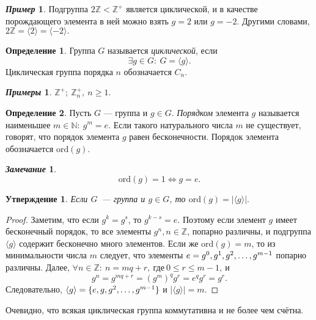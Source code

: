 \documentclass[a4paper, 14pt]{extarticle}
\newcommand{\integers}{\mathbb{Z}}
\newcommand{\naturals}{\mathbb{N}}
\newcommand{\ord}{\mathrm{ord}}
\newcommand{\suchthat}{{:}{ } \ }
\theoremstyle{definition}
\newtheorem*{exmpl*}{\textit{Пример}}
\newtheorem*{exmpls}{\textit{Примеры}}
\newtheorem*{remark}{\textit{Замечание}}
\newtheorem{definition}{Определение}
\theoremstyle{plain}
\numberwithin{theorem}{section}
\numberwithin{definition}{section}
\newtheorem{statement}{Утверждение}
\numberwithin{statement}{section}
\numberwithin{lemma}{section}
\numberwithin{consequence}{section}
\begin{document}
	\begin{exmpl*}
		Подгруппа ${2\integers < \integers ^ +}$ является циклической, и в качестве порождающего элемента в ней можно взять $g = 2$ или $g = -2.$ Другими словами, ${2\integers = \langle 2 \rangle = \langle -2 \rangle.}$
	\end{exmpl*}
	\begin{definition}
		Группа $G$ называется \textit{циклической}, если 
		\begin{equation*}
			\exists g \in G \suchthat G = \langle g \rangle.
		\end{equation*}
		Циклическая группа порядка $n$ обозначается ${C_n.}$
	\end{definition}
	\begin{exmpls}
		${\integers ^ +; \ \integers_n ^ +, \ n \geqslant 1.}$
	\end{exmpls}
	\begin{definition}
		Пусть $G$ — группа и ${g \in G}$. \textit{Порядком} элемента $g$ называется наименьшее ${m \in \naturals \suchthat g^m = e}$. Если такого натурального числа $m$ не существует, говорят, что порядок элемента $g$ равен бесконечности. Порядок элемента обозначается $\ord(g)$.
	\end{definition}
	\begin{remark}
		\begin{equation*}
			\ord(g) = 1 \Longleftrightarrow g = e.
		\end{equation*}
		
	\end{remark}
	\begin{statement}
		Если $G$~--- группа и $g \in G$, то $\ord(g) = |\langle g \rangle|.$
	\end{statement}
	\begin{proof}
		Заметим, что если $g^k = g^s$, то $g^{k - s} = e$. Поэтому если элемент $g$ имеет бесконечный порядок, то все элементы $g^n, n \in \integers$, попарно различны, и подгруппа $\langle g \rangle$ содержит бесконечно много элементов. 
		Если же ${\ord(g) = m}$, то из минимальности числа $m$ следует, что элементы ${e = g^0, g^1, g^2, \mathellipsis , g^{m-1}}$ попарно различны.
		Далее, ${\forall n \in \integers{:} \ n = mq + r, \ \text{где} \ 0 \leqslant r \leq m - 1, \ \text{и}}$
		\begin{equation*}
			g^n = g^{mq + r} = (g^m)^q g^r = e^q g^r = g^r.
		\end{equation*}
		Следовательно, $\langle g \rangle = \{e, g, g^2, \mathellipsis, g^{m - 1}\}$ и $|\langle g \rangle| = m.$
	\end{proof}
	Очевидно, что всякая циклическая группа коммутативна и не более чем счётна.
	\newpage
\end{document}
